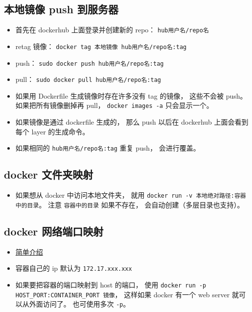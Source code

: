 \subsection{本地镜像 push 到服务器}
\begin{itemize}
\item 首先在 dockerhub 上面登录并创建新的 repo： \verb`hub用户名/repo名`
\item retag 镜像： \verb`docker tag 本地镜像 hub用户名/repo名:tag`
\item push： \verb`sudo docker push hub用户名/repo名:tag`
\item pull： \verb`sudo docker pull hub用户名/repo名:tag`
\item 如果用 Dockerfile 生成镜像时存在许多没有 tag 的镜像， 这些不会被 push。 如果把所有镜像删掉再 pull， \verb`docker images -a` 只会显示一个。
\item 如果镜像是通过 dockerfile 生成的， 那么 push 以后在 dockerhub 上面会看到每个 layer 的生成命令。
\item 如果相同的 \verb`hub用户名/repo名:tag` 重复 push， 会进行覆盖。
\end{itemize}

\subsection{docker 文件夹映射}
\begin{itemize}
\item 如果想从 docker 中访问本地文件夹， 就用 \verb`docker run -v 本地绝对路径:容器中的目录`。 注意 \verb`容器中的目录` 如果不存在， 会自动创建（多层目录也支持）。
\end{itemize}

\subsection{docker 网络端口映射}
\begin{itemize}
\item \href{https://www.freecodecamp.org/news/how-to-get-a-docker-container-ip-address-explained-with-examples/}{简单介绍}
\item 容器自己的 ip 默认为 \verb`172.17.xxx.xxx`
\item 如果要把容器的端口映射到 host 的端口， 使用 \verb`docker run -p HOST_PORT:CONTAINER_PORT 镜像`， 这样如果 docker 有一个 web server 就可以从外面访问了。 也可使用多次 \verb`-p`。
\end{itemize}


